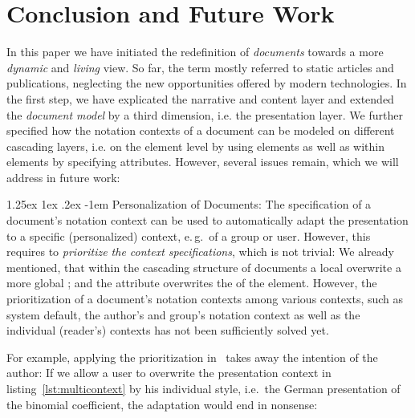 \documentclass[pdftex,bibtotocnumbered,idxtotoc,11pt]{scrartcl}
\makeatletter
\renewcommand\paragraph{\@startsection{paragraph}{4}{\z@}%
{1.25ex \@plus1ex \@minus.2ex}%
{-1em}%
{\setlength{\parfillskip}{\z@ \@plus 1fil}%
\raggedsection\normalfont\sectfont\nobreak
\size@paragraph\nobreak}}
\makeatother
\begin{document}
\section{Conclusion and Future Work}\label{sec:outlook}

In this paper we have initiated the redefinition of {\emph{documents}} towards a more
{\emph{dynamic}} and {\emph{living}} view. So far, the term mostly referred to static
articles and publications, neglecting the new opportunities offered by modern
technologies.  In the first step, we have explicated the narrative and content layer and
extended the {\emph{document model}} by a third dimension, i.e. the presentation layer. We
further specified how the notation contexts of a document can be modeled on different
cascading layers, i.e. on the {} element level by using
{} elements as well as within {} elements by specifying
{} attributes. However, several issues remain, which we will address in
future work:


\paragraph{Personalization of Documents:} The specification of a document's notation
context can be used to automatically adapt the presentation to a specific (personalized)
context, e.\,g.\ of a group or user. However, this requires to {\emph{prioritize the
    context specifications}}, which is not trivial: We already mentioned, that within the
cascading structure of documents a local {} overwrite a more global
{}; and the {} attribute overwrites the
{} of the {} element. However, the prioritization of a
document's notation contexts among various contexts, such as system default, the author's
and group's notation context as well as the individual (reader's) contexts has not been
sufficiently solved yet.

For example, applying the prioritization in~\cite{ManLib:apo05} takes away the intention
of the author: If we allow a user to overwrite the presentation context in
listing~\ref{lst:multicontext} by his individual style, i.e.\ the German presentation of
the binomial coefficient, the adaptation would end in nonsense:
\end{document}
